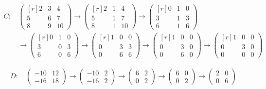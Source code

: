 \documentclass[a4paper,10pt,numbers=noenddot]{scrartcl}
\begin{document}
\begin{align*}
  C:
  &\,
  \begin{pmatrix*}[r]
    2 & 3 &  4  \\
    5 & 6 &  7  \\
    8 & 9 & 10
  \end{pmatrix*}
  \to
  \begin{pmatrix*}[r]
    2 & 1 &  4  \\
    5 & 1 &  7  \\
    8 & 1 & 10
  \end{pmatrix*}
  \to
  \begin{pmatrix*}[r]
    0 & 1 & 0 \\
    3 & 1 & 3 \\
    6 & 1 & 6
  \end{pmatrix*}
  \\
  &\,
  \to
  \begin{pmatrix*}[r]
    0 & 1 & 0 \\
    3 & 0 & 3 \\
    6 & 0 & 6
  \end{pmatrix*}
  \to
  \begin{pmatrix*}[r]
    1 & 0 & 0 \\
    0 & 3 & 3 \\
    0 & 6 & 6
  \end{pmatrix*}
  \to
  \begin{pmatrix*}[r]
    1 & 0 & 0 \\
    0 & 3 & 0 \\
    0 & 6 & 0
  \end{pmatrix*}
  \to
  \begin{pmatrix*}[r]
    1 & 0 & 0 \\
    0 & 3 & 0 \\
    0 & 0 & 0
  \end{pmatrix*}
\end{align*}

\begin{align*}
  D:
  &\
  \begin{pmatrix}
    -10 & 12  \\
    -16 & 18
  \end{pmatrix}
  \to
  \begin{pmatrix}
    -10 & 2 \\
    -16 & 2
  \end{pmatrix}
  \to
  \begin{pmatrix}
    6 & 2 \\
    0 & 2
  \end{pmatrix}
  \to
  \begin{pmatrix}
    6 & 0 \\
    0 & 2
  \end{pmatrix}
  \to
  \begin{pmatrix}
    2 & 0 \\
    0 & 6
  \end{pmatrix}
\end{align*}
\end{document}
